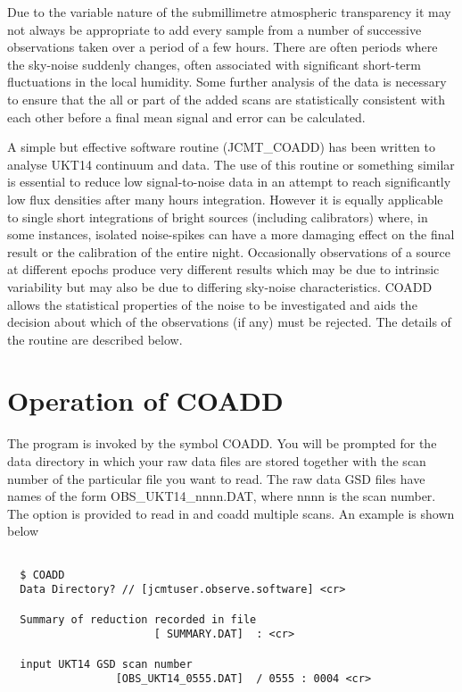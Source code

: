 Due to the variable nature of the submillimetre atmospheric transparency it may
not always be appropriate to add every sample from a number of successive
observations taken over
a period of a few hours. There are often periods where the sky-noise suddenly
changes, often associated with significant short-term fluctuations in the local
humidity. Some further analysis of the data is necessary to ensure that the
all or part of the added scans are statistically consistent with each other
before a final mean signal and error can be calculated.



A simple but effective software routine (JCMT\_COADD) has been written to
analyse UKT14 continuum and data.
The use of this routine or something similar is essential to reduce
low signal-to-noise data in an attempt to reach significantly low flux
densities after many hours integration. However it is
equally applicable to single short integrations of bright sources (including
calibrators) where, in some instances,  isolated noise-spikes can have a
more damaging effect on the final result or the calibration of the
entire night.
Occasionally observations of a source at different epochs produce very
different results which may be due to intrinsic variability but may also
be due to differing sky-noise characteristics. COADD allows the statistical
properties of the noise to be investigated and aids the decision about
which of the observations (if any) must be rejected.
The details of the routine are described below.

\section{Operation of COADD}

 The program is invoked by the symbol COADD. You will be
prompted for the data directory in which your raw data files are stored
together with the scan number of the particular file you want to read. The
raw data GSD files have names of the form OBS\_UKT14\_nnnn.DAT, where nnnn
is the scan number.  The option is provided to read in and coadd multiple
scans. An example is shown below

\begin{verbatim}

  $ COADD
  Data Directory? // [jcmtuser.observe.software] <cr>

  Summary of reduction recorded in file
                       [ SUMMARY.DAT]  : <cr>

  input UKT14 GSD scan number
                 [OBS_UKT14_0555.DAT]  / 0555 : 0004 <cr>

\end{verbatim}

